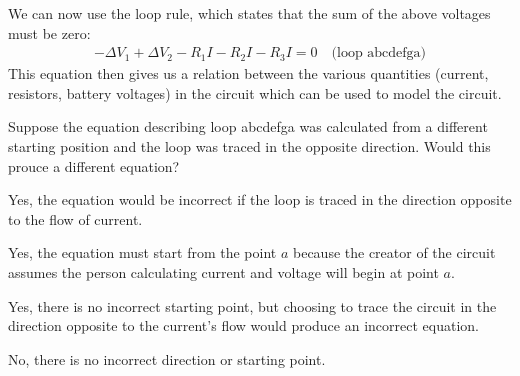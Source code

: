 We can now use the loop rule, which states that the sum of the above voltages must be zero:
\begin{align*}
-\Delta V_1 + \Delta V_2 - R_1I - R_2I - R_3I = 0\quad \text{(loop abcdefga)}
\end{align*}
This equation then gives us a relation between the various quantities (current, resistors, battery voltages) in the circuit which can be used to model the circuit.  


\begin{checkpoint}{1}
	\begin{MCquestion}{Suppose the equation describing loop abcdefga was calculated from a different starting position and the loop was traced in the opposite direction. Would this prouce a different equation?}
		\item Yes, the equation would be incorrect if the loop is traced in the direction opposite to the flow of current.
		\item Yes, the equation must start from the point $a$ because the creator of the circuit assumes the person calculating current and voltage will begin at point $a$.
		\item Yes, there is no incorrect starting point, but choosing to trace the circuit in the direction opposite to the current's flow would produce an incorrect equation.
		\item No, there is no incorrect direction or starting point. \correct
	\end{MCquestion}
\end{checkpoint}

